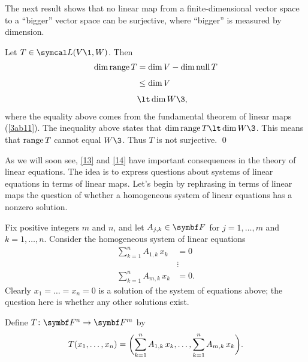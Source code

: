 \pagebreak[3]

The next result shows that no linear map from a finite-dimensional vector space to a ``bigger''
vector space can be surjective, where ``bigger'' is measured by dimension.


\proof
Let $T \in \L(V\1,W)$.  Then
\begin{align*}
\dim \ran T &= \dim V - \dim \ker T \\[4bp]
&\le \dim V \\[4bp]
&\lt \dim W\3,
\end{align*}
where the equality above comes from the fundamental theorem of linear maps (\ref{3ab11}). The inequality above states that
\mbox{$\dim \ran T \lt \dim W\3$.}  This means that $\ran T$ cannot equal $W\3$.  Thus $T$ is not
surjective.
\qed

As we will soon see, \ref{13} and \ref{14} have important consequences in the theory of linear
equations. The idea is to express questions about systems of linear equations in terms of linear maps. Let's begin by rephrasing in terms of linear maps the question of whether a homogeneous system of linear equations has a nonzero solution.


Fix positive integers $m$ and $n$, and let
$A_{j,k} \in \F{}$ for $j = 1, \dots, m$ and \mbox{$k = 1, \dots , n$}. Consider the homogeneous system of linear equations
\begin{align*}
\sum_{k=1}^n A_{1,k}\,x_k &= 0 \\%
& \vdots \\%
\sum_{k=1}^n A_{m,k}\,x_k &= 0.
\end{align*}
Clearly $x_1 = \dots = x_n = 0$ is a solution of the system of equations above; the question here is whether any other solutions exist.

Define $T\colon \F{n}  \rightarrow \F{m}$
by
\begin{equation} \label{3sim}
T(x_1, \dots, x_n) =
\paren[\bigg]{\sum_{k=1}^n A_{1,k} \, x_k, \dots, \sum_{k=1}^n A_{m,k} \, x_k}.
\end{equation}%

